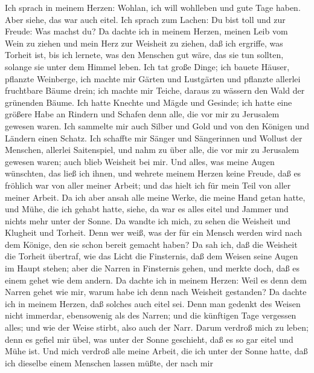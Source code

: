  Ich sprach in meinem Herzen: Wohlan, ich will wohlleben und
gute Tage haben. Aber siehe, das war auch eitel.  Ich sprach
zum Lachen: Du bist toll und zur Freude: Was machst du?  Da
dachte ich in meinem Herzen, meinen Leib vom Wein zu ziehen und mein
Herz zur Weisheit zu ziehen, daß ich ergriffe, was Torheit ist, bis ich
lernete, was den Menschen gut wäre, das sie tun sollten, solange sie
unter dem Himmel leben.  Ich tat große Dinge; ich bauete
Häuser, pflanzte Weinberge,  ich machte mir Gärten und
Lustgärten und pflanzte allerlei fruchtbare Bäume drein; 
ich machte mir Teiche, daraus zu wässern den Wald der grünenden Bäume.
 Ich hatte Knechte und Mägde und Gesinde; ich hatte eine
größere Habe an Rindern und Schafen denn alle, die vor mir zu Jerusalem
gewesen waren.  Ich sammelte mir auch Silber und Gold und
von den Königen und Ländern einen Schatz. Ich schaffte mir Sänger und
Sängerinnen und Wollust der Menschen, allerlei Saitenspiel, 
und nahm zu über alle, die vor mir zu Jerusalem gewesen waren; auch
blieb Weisheit bei mir.  Und alles, was meine Augen
wünschten, das ließ ich ihnen, und wehrete meinem Herzen keine Freude,
daß es fröhlich war von aller meiner Arbeit; und das hielt ich für mein
Teil von aller meiner Arbeit.  Da ich aber ansah alle meine
Werke, die meine Hand getan hatte, und Mühe, die ich gehabt hatte,
siehe, da war es alles eitel und Jammer und nichts mehr unter der Sonne.
 Da wandte ich mich, zu sehen die Weisheit und Klugheit und
Torheit. Denn wer weiß, was der für ein Mensch werden wird nach dem
Könige, den sie schon bereit gemacht haben?  Da sah ich,
daß die Weisheit die Torheit übertraf, wie das Licht die Finsternis,
 daß dem Weisen seine Augen im Haupt stehen; aber die
Narren in Finsternis gehen, und merkte doch, daß es einem gehet wie dem
andern.  Da dachte ich in meinem Herzen: Weil es denn dem
Narren gehet wie mir, warum habe ich denn nach Weisheit gestanden? Da
dachte ich in meinem Herzen, daß solches auch eitel sei. 
Denn man gedenkt des Weisen nicht immerdar, ebensowenig als des Narren;
und die künftigen Tage vergessen alles; und wie der Weise stirbt, also
auch der Narr.  Darum verdroß mich zu leben; denn es gefiel
mir übel, was unter der Sonne geschieht, daß es so gar eitel und Mühe
ist.  Und mich verdroß alle meine Arbeit, die ich unter der
Sonne hatte, daß ich dieselbe einem Menschen lassen müßte, der nach mir
